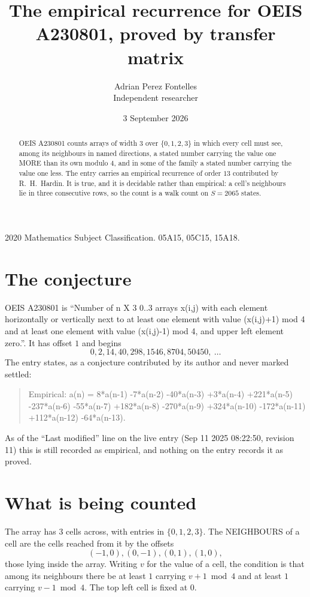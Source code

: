 \documentclass[11pt,a4paper]{article}
\title{The empirical recurrence for OEIS A230801, proved by transfer matrix}
\author{Adrian Perez Fontelles\\ \small Independent researcher}
\date{3 September 2026}
\theoremstyle{plain}
\theoremstyle{definition}
\begin{document}
\maketitle

\begin{abstract}
OEIS A230801 counts arrays of width $3$ over $\{0,1,2,3\}$ in which every cell must see, among its
neighbours in named directions, a stated number carrying the value one MORE than its own
modulo $4$, and in some of the family a stated number carrying the value one less. The entry
carries an empirical recurrence of order $13$ contributed by R.~H.~Hardin. It is true, and
it is decidable rather than empirical: a cell's neighbours lie in three consecutive rows, so
the count is a walk count on $S=2065$ states.
\end{abstract}

\noindent\small 2020 Mathematics Subject Classification. 05A15, 05C15, 15A18.\normalsize

\section{The conjecture}

OEIS A230801 is ``Number of n X 3 0..3 arrays x(i,j) with each element horizontally or vertically next to at least one element with value (x(i,j)+1) mod 4 and at least one element with value (x(i,j)-1) mod 4, and upper left element zero.''. It has offset $1$ and begins
\[
0, 2, 14, 40, 298, 1546, 8704, 50450,\ \dots
\]
The entry states, as a conjecture contributed by its author and never marked settled:
\begin{quote}
Empirical: a(n) = 8*a(n-1) -7*a(n-2) -40*a(n-3) +3*a(n-4) +221*a(n-5) -237*a(n-6) -55*a(n-7) +182*a(n-8) -270*a(n-9) +324*a(n-10) -172*a(n-11) +112*a(n-12) -64*a(n-13).
\end{quote}
As of the ``Last modified'' line on the live entry (Sep 11 2025 08:22:50, revision 11) this is still
recorded as empirical, and nothing on the entry records it as proved.

\section{What is being counted}

The array has $3$ cells across, with entries in $\{0,1,2,3\}$. The NEIGHBOURS of a cell are the
cells reached from it by the offsets
\[
(-1,0), (0,-1), (0,1), (1,0),
\]
those lying inside the array. Writing $v$ for the value of a cell, the condition is that among
its neighbours there be at least $1$ carrying $v+1 \bmod 4$ and at least $1$ carrying $v-1 \bmod 4$. The top left
cell is fixed at $0$.
\end{document}
